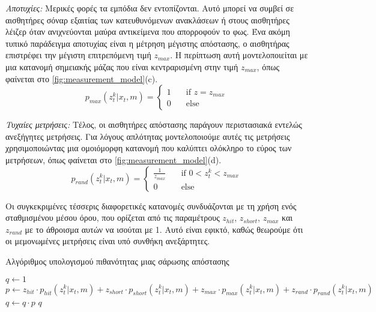\emph{Αποτυχίες:} Μερικές φορές τα εμπόδια δεν εντοπίζονται. Αυτό μπορεί να συμβεί σε αισθητήρες σόναρ εξαιτίας των κατευθυνόμενων ανακλάσεων ή στους αισθητήρες λέιζερ όταν ανιχνεύονται μαύρα αντικείμενα που απορροφούν το φως. Ένα ακόμη τυπικό παράδειγμα αποτυχίας είναι η μέτρηση μέγιστης απόστασης, ο αισθητήρας επιστρέφει την μέγιστη επιτρεπόμενη τιμή $z_{max}$. Η περίπτωση αυτή μοντελοποιείται με μια κατανομή σημειακής μάζας που είναι κεντραρισμένη στην τιμή $z_{max}$, όπως φαίνεται στο \autoref{fig:measurement_model}(c).
\begin{equation*}
 p_{max}(z_t^k | x_t, m) =
  \begin{cases}
    1 & \quad \text{if } z = z_{max}\\
    0  & \quad \text{else}
  \end{cases}
\end{equation*}

\emph{Τυχαίες μετρήσεις:}  Τέλος, οι αισθητήρες απόστασης παράγουν περιστασιακά εντελώς ανεξήγητες μετρήσεις. Για λόγους απλότητας μοντελοποιούμε αυτές τις μετρήσεις χρησιμοποιώντας μια ομοιόμορφη κατανομή που καλύπτει ολόκληρο το εύρος των μετρήσεων, όπως φαίνεται στο \autoref{fig:measurement_model}(d).
\begin{equation*}
 p_{rand}(z_t^k | x_t, m) =
  \begin{cases}
    \frac{1}{z_{max}} & \quad \text{if } 0 < z_t^k < z_{max}\\
    0  & \quad \text{else}
  \end{cases}
\end{equation*}

Οι συγκεκριμένες τέσσερις διαφορετικές κατανομές συνδυάζονται με τη χρήση ενός σταθμισμένου μέσου όρου, που ορίζεται από τις παραμέτρους $z_{hit}$, $z_{short}$, $z_{max}$ και $z_{rand}$ με το άθροισμα αυτών να ισούται με 1. Αυτό είναι εφικτό, καθώς θεωρούμε ότι οι μεμονωμένες μετρήσεις είναι υπό συνθήκη ανεξάρτητες.

\begin{algorithm}[!ht]
 \caption{Αλγόριθμος υπολογισμού πιθανότητας μιας σάρωσης απόστασης}
 \label{alg:range_model}
    \begin{algorithmic}[1]
        \State $q \gets 1$
            \State $p \gets z_{hit} \cdot p_{hit}(z_t^k | x_t, m) + z_{short} \cdot p_{short}(z_t^k | x_t, m) + z_{max} \cdot  p_{max}(z_t^k | x_t, m) + z_{rand} \cdot p_{rand}(z_t^k | x_t, m)$
            \State $q \gets q \cdot p$
        \EndFor
        \State \Return $q$
    \end{algorithmic}
\end{algorithm}


